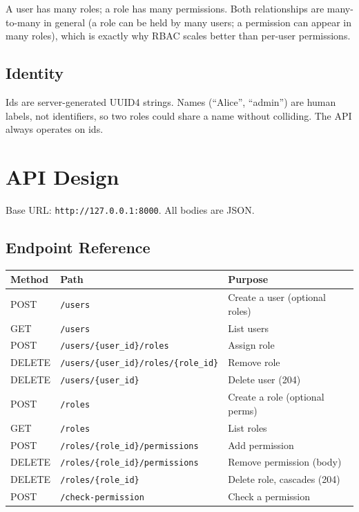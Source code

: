 \documentclass[11pt,a4paper]{report}
\begin{document}
A user has many roles; a role has many permissions. Both relationships are
many-to-many in general (a role can be held by many users; a permission can
appear in many roles), which is exactly why RBAC scales better than
per-user permissions.

\section{Identity}

Ids are server-generated UUID4 strings. Names (``Alice'', ``admin'') are human
labels, not identifiers, so two roles could share a name without colliding. The
API always operates on ids.

\chapter{API Design}

Base URL: \texttt{http://127.0.0.1:8000}. All bodies are JSON.

\section{Endpoint Reference}

\begin{longtable}{p{} p{} p{}}
\textbf{Method} & \textbf{Path} & \textbf{Purpose} \\
\hline
\endhead
POST & \texttt{/users} & Create a user (optional roles) \\
GET & \texttt{/users} & List users \\
POST & \texttt{/users/\{user\_id\}/roles} & Assign role \\
DELETE & \texttt{/users/\{user\_id\}/roles/\{role\_id\}} & Remove role \\
DELETE & \texttt{/users/\{user\_id\}} & Delete user (204) \\
POST & \texttt{/roles} & Create a role (optional perms) \\
GET & \texttt{/roles} & List roles \\
POST & \texttt{/roles/\{role\_id\}/permissions} & Add permission \\
DELETE & \texttt{/roles/\{role\_id\}/permissions} & Remove permission (body) \\
DELETE & \texttt{/roles/\{role\_id\}} & Delete role, cascades (204) \\
POST & \texttt{/check-permission} & Check a permission \\
\end{longtable}
\end{document}
